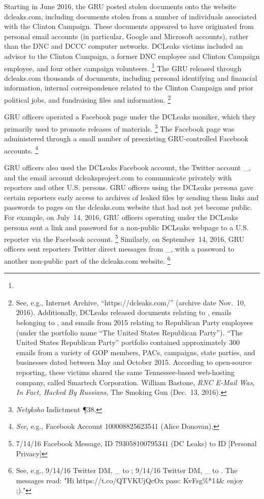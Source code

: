 Starting in June 2016, the GRU posted stolen documents onto the website dcleaks.com, including documents stolen from a number of individuals associated with the Clinton Campaign.
These documents appeared to have originated from personal email accounts (in particular, Google and Microsoft accounts), rather than the DNC and DCCC computer networks.
DCLeaks victims included an advisor to the Clinton Campaign, a former DNC employee and Clinton Campaign employee, and four other campaign volunteers.%
\footnote{}
The GRU released through dcleaks.com thousands of documents, including personal identifying and financial information, internal correspondence related to the Clinton Campaign and prior political jobs, and fundraising files and information.%
\footnote{See, e.g., Internet Archive, “https://dcleaks.com/” (archive date Nov.~10, 2016).
Additionally, DCLeaks released documents relating to , emails belonging to , and emails from 2015 relating to Republican Party employees (under the portfolio name “The United States Republican Party”).
“The United States Republican Party” portfolio contained approximately 300 emails from a variety of GOP members, PACs, campaigns, state parties, and businesses dated between May and October 2015.
According to open-source reporting, these victims shared the same Tennessee-based web-hosting company, called Smartech Corporation.
William Bastone, \textit{RNC E-Mail Was, In Fact, Hacked By Russians}, The Smoking Gun (Dec.~13, 2016).}

GRU officers operated a Facebook page under the DCLeaks moniker, which they primarily used to promote releases of materials.%
\footnote{\textit{Netyksho} Indictment \P 38.}
The Facebook page was administered through a small number of preexisting GRU-controlled Facebook accounts.%
\footnote{\textit{See}, e.g., Facebook Account 100008825623541 (Alice Donovan).}

GRU officers also used the DCLeaks Facebook account, the Twitter account \@dcleaks\_, and the email account dcleaksproject\@gmail.com to communicate privately with reporters and other U.S. persons.
GRU officers using the DCLeaks persona gave certain reporters early access to archives of leaked files by sending them links and passwords to pages on the dcleaks.com website that had not yet become public.
For example, on July~14, 2016, GRU officers operating under the DCLeaks persona sent a link and password for a non-public DCLeaks webpage to a U.S. reporter via the Facebook account.%
\footnote{7/14/16 Facebook Message, ID 793058100795341 (DC Leaks) to ID [Personal Privacy]}
Similarly, on September~14, 2016, GRU officers sent reporters Twitter direct messages from \@dcleaks\_, with a password to another non-public part of the dcleaks.com website.%
\footnote{See, e.g., 9/14/16 Twitter DM, \@dcleaks\_ to ;
9/14/16 Twitter DM, \@dcleaks\_ to .
The messages read: "Hi https://t.co/QTVKUjQcOx pass: KvFsg\%*14\@gPgu\& enjoy ;)."}

